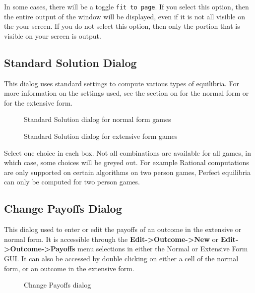 \documentclass[12pt]{report}
\begin{document}
In some cases, there will be a toggle \verb+fit to page+.  If you
select this option, then the entire output of the window will be
displayed, even if it is not all visible on the your screen.  If you
do not select this option, then only the portion that is visible on
your screen is output.

\subsection{Standard Solution Dialog}\label{StandardSolution}

This dialog uses standard settings to compute various types of
equilibria. For more information on the settings used, see the section
on  for the
normal form or  
for the extensive form.

\begin{figure}
\caption{Standard Solution dialog for normal form
games}\label{fig_standardsolnf}
\end{figure}

\begin{figure}
\caption{Standard Solution dialog for extensive form
games}\label{fig_standardsolef}
\end{figure}

Select one choice in each box.  Not all combinations are available for
all games, in which case, some choices will be greyed out.  For
example Rational computations are only supported on certain algorithms
on two person games, Perfect equilibria can only be computed for two
person games.

\subsection{Change Payoffs Dialog}\label{ChangePayoff}

This dialog used to enter or edit the payoffs of an outcome in the
extensive or normal form. It is accessible through the {\bf 
Edit->Outcome->New} or {\bf Edit->Outcome->Payoffs} menu selections in
either the Normal or Extensive Form GUI. It can also be accessed by
double clicking on either a cell of the normal form, or an outcome in
the extensive form. 

\begin{figure}
\caption{Change Payoffs dialog}\label{fig_changepay}
\end{figure}
\end{document}
